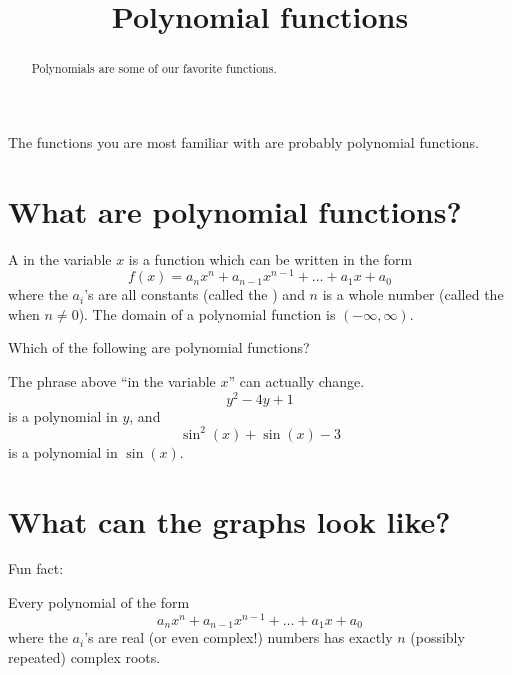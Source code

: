 \documentclass{ximera}
\title[Dig-In:]{Polynomial functions}
\begin{document}
\begin{abstract}
  Polynomials are some of our favorite functions. 
\end{abstract}
\maketitle


The functions you are most familiar with are probably polynomial
functions.

\section{What are polynomial functions?}

\begin{definition}
  A  in the variable $x$ is a function
  which can be written in the form
  \[
  f(x) = a_nx^n + a_{n-1}x^{n-1} + \dots + a_1 x + a_0
  \]
  where the $a_i$'s are all constants (called the )
  and $n$ is a whole number (called the  when $n\ne
  0$). The domain of a polynomial function is $(-\infty,\infty)$.
\end{definition}

\begin{question}
  Which of the following are polynomial functions?
  \begin{selectAll}
  \end{selectAll}
\end{question}

The phrase above ``in the variable $x$'' can actually change.
\[
y^2-4y +1
\]
is a polynomial in $y$, and
\[
\sin^2(x) + \sin(x) -3 
\]
is a polynomial in $\sin(x)$.


\section{What can the graphs look like?}

Fun fact:

\begin{theorem}
  Every polynomial of the form
  \[
  a_n x^n + a_{n-1} x^{n-1} + \dots + a_1 x + a_0
  \]
  where the $a_i$'s are real (or even complex!) numbers has exactly
  $n$ (possibly repeated) complex roots.
\end{theorem}
\end{document}
